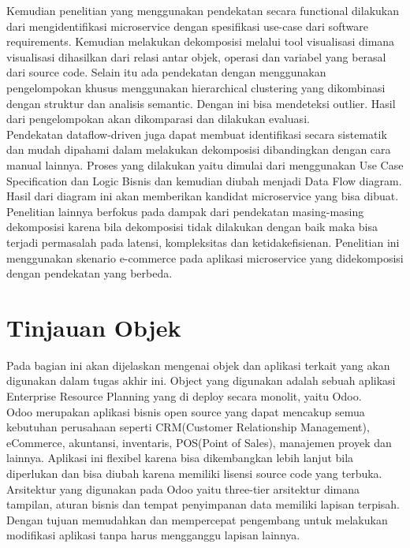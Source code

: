 Kemudian penelitian yang menggunakan pendekatan secara functional dilakukan dari mengidentifikasi microservice dengan spesifikasi use-case dari software requirements. Kemudian melakukan dekomposisi melalui tool visualisasi dimana visualisasi dihasilkan dari relasi antar objek, operasi dan variabel yang berasal dari source code.
Selain itu ada pendekatan dengan menggunakan pengelompokan khusus menggunakan hierarchical clustering yang dikombinasi dengan struktur dan analisis semantic. Dengan ini bisa mendeteksi outlier. Hasil dari pengelompokan akan dikomparasi dan dilakukan evaluasi.\\

Pendekatan dataflow-driven juga dapat membuat identifikasi secara sistematik dan mudah dipahami dalam melakukan dekomposisi dibandingkan dengan cara manual lainnya. Proses yang dilakukan yaitu dimulai dari menggunakan Use Case Specification dan Logic Bisnis dan kemudian diubah menjadi Data Flow diagram. Hasil dari diagram ini akan memberikan kandidat microservice yang bisa dibuat.\\

Penelitian lainnya berfokus pada dampak dari pendekatan masing-masing dekomposisi karena bila dekomposisi tidak dilakukan dengan baik maka bisa terjadi permasalah pada latensi, kompleksitas dan ketidakefisienan. Penelitian ini menggunakan skenario e-commerce pada aplikasi microservice yang didekomposisi dengan pendekatan yang berbeda.\\

\section{Tinjauan Objek}
Pada bagian ini akan dijelaskan mengenai objek dan aplikasi terkait yang akan digunakan dalam tugas akhir ini. Object yang digunakan adalah sebuah aplikasi Enterprise Resource Planning yang di deploy secara monolit, yaitu Odoo.\\

Odoo merupakan aplikasi bisnis open source yang dapat mencakup semua kebutuhan perusahaan seperti CRM(Customer Relationship Management), eCommerce, akuntansi, inventaris, POS(Point of Sales), manajemen proyek dan lainnya. Aplikasi ini flexibel karena bisa dikembangkan lebih lanjut bila diperlukan dan bisa diubah karena memiliki lisensi source code yang terbuka. \\

Arsitektur yang digunakan pada Odoo yaitu three-tier arsitektur dimana tampilan, aturan bisnis dan tempat penyimpanan data memiliki lapisan terpisah. Dengan tujuan memudahkan dan mempercepat pengembang untuk melakukan modifikasi aplikasi tanpa harus mengganggu lapisan lainnya.\\

